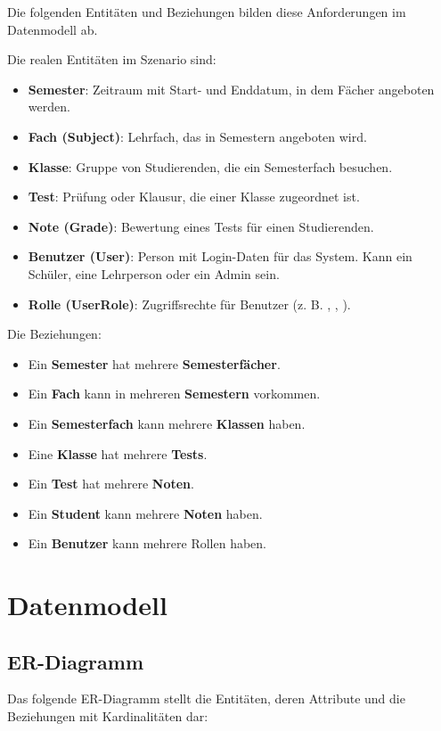 \documentclass[12pt,a4paper]{article}
\newcommand{\code}[1]{\texttt{\detokenize{#1}}}
\begin{document}
    Die folgenden Entitäten und Beziehungen bilden diese Anforderungen im Datenmodell ab.

    Die realen Entitäten im Szenario sind:

    \begin{itemize}
        \item \textbf{Semester}: Zeitraum mit Start- und Enddatum, in dem Fächer angeboten werden.
        \item \textbf{Fach (Subject)}: Lehrfach, das in Semestern angeboten wird.
        \item \textbf{Klasse}: Gruppe von Studierenden, die ein Semesterfach besuchen.
        \item \textbf{Test}: Prüfung oder Klausur, die einer Klasse zugeordnet ist.
        \item \textbf{Note (Grade)}: Bewertung eines Tests für einen Studierenden.
        \item \textbf{Benutzer (User)}: Person mit Login-Daten für das System. Kann ein Schüler, eine Lehrperson oder ein Admin sein.
        \item \textbf{Rolle (UserRole)}: Zugriffsrechte für Benutzer (z. B. \code{STUDENT}, \code{TEACHER}, \code{ADMIN}).
    \end{itemize}

    Die Beziehungen:
    \begin{itemize}
        \item Ein \textbf{Semester} hat mehrere \textbf{Semesterfächer}.
        \item Ein \textbf{Fach} kann in mehreren \textbf{Semestern} vorkommen.
        \item Ein \textbf{Semesterfach} kann mehrere \textbf{Klassen} haben.
        \item Eine \textbf{Klasse} hat mehrere \textbf{Tests}.
        \item Ein \textbf{Test} hat mehrere \textbf{Noten}.
        \item Ein \textbf{Student} kann mehrere \textbf{Noten} haben.
        \item Ein \textbf{Benutzer} kann mehrere Rollen haben.
    \end{itemize}

    \section{Datenmodell}

    \subsection{ER-Diagramm}
    Das folgende ER-Diagramm stellt die Entitäten, deren Attribute und die Beziehungen mit Kardinalitäten dar:
\end{document}
